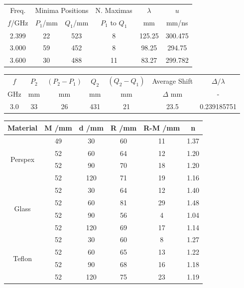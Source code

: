 \documentclass[12pt]{article}
\begin{document}
\begin{center}
    \begin{tabular}{|c|c|c|c|c|c|}
    \hline
    Freq. & \multicolumn{2}{|c|}{Minima Positions} & N. Maximas &$\lambda$ & $u$ \\
    $f$/GHz & $P_1$/mm & $Q_1$/mm & $P_1$ to $Q_1$ & mm & mm/ns\\
    \hline 
    2.399	& 22	& 523	& 8	    & 125.25	& 300.475 \\
    3.000	& 59	& 452	& 8	    & 98.25	    & 294.75 \\
    3.600	& 30	& 488	& 11	& 83.27	    & 299.782 \\
    \hline
    \end{tabular}
\end{center}

\begin{center}
    \begin{tabular}{|c|c|c|c|c|c|c|}
    \hline
    $f$ & $P_2$ & $(P_2-P_1)$ & $Q_2$ & $(Q_2-Q_1)$ & Average Shift & $\Delta / \lambda$ \\
    GHz & mm & mm & mm & mm & $\Delta$ mm & - \\
    \hline 
    3.0 & 33 & 26 & 431 & 21 & 23.5 & 0.239185751 \\
    \hline
    \end{tabular}
\end{center}

\begin{center}
    \begin{tabular}{|c|c|c|c|c|c|}
    \hline
    Material & M /mm & d /mm & R /mm & R-M /mm & n \\
    \hline  
    \multirow{4}{*}{Perspex}& 49	& 30	& 60	& 11	& 1.37 \\
        	                & 52	& 60	& 64	& 12	& 1.20 \\
        	                & 52	& 90	& 70	& 18	& 1.20 \\
        	                & 52	& 120	& 71	& 19	& 1.16 \\
    \hline
    \multirow{4}{*}{Glass}	& 52	& 30	& 64	& 12	& 1.40 \\
        	                & 52	& 60	& 81	& 29	& 1.48 \\
        	                & 52	& 90	& 56	& 4	    & 1.04 \\
        	                & 52	& 120	& 69	& 17	& 1.14 \\
    \hline
    \multirow{4}{*}{Teflon}	& 52	& 30	& 60	& 8	    & 1.27 \\
                        	& 52	& 60	& 65	& 13	& 1.22 \\
                        	& 52	& 90	& 68	& 16	& 1.18 \\
                        	& 52	& 120	& 75	& 23	& 1.19 \\
    \hline
    \end{tabular}
\end{center}
\end{document}
